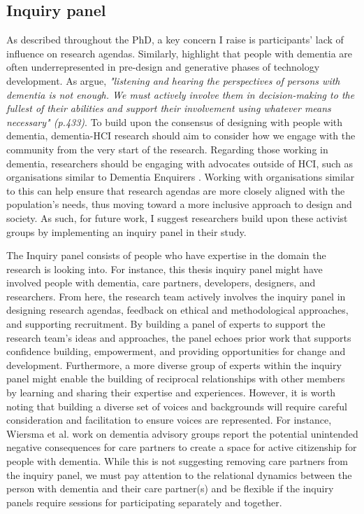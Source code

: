 \subsection{Inquiry panel}
\label{Inquiry Panel}
As described throughout the PhD, a key concern I raise is participants' lack of influence on research agendas. Similarly, \cite{suijkerbuijk_active_2019} highlight that people with dementia are often underrepresented in pre-design and generative phases of technology development. As \cite{dupuis_moving_2012} argue, \textit{"listening and hearing the perspectives of persons with dementia is not enough. We must actively involve them in decision-making to the fullest of their abilities and support their involvement using whatever means necessary" (p.433)}. To build upon the consensus of designing with people with dementia, dementia-HCI research should aim to consider how we engage with the community from the very start of the research. Regarding those working in dementia, researchers should be engaging with advocates outside of HCI, such as organisations similar to Dementia Enquirers \citep{davies2021dementia}. Working with organisations similar to this can help ensure that research agendas are more closely aligned with the population's needs, thus moving toward a more inclusive approach to design and society. As such, for future work, I suggest researchers build upon these activist groups by implementing an inquiry panel in their study.

The Inquiry panel consists of people who have expertise in the domain the research is looking into. For instance, this thesis inquiry panel might have involved people with dementia, care partners, developers, designers, and researchers. From here, the research team actively involves the inquiry panel in designing research agendas, feedback on ethical and methodological approaches, and supporting recruitment. By building a panel of experts to support the research team’s ideas and approaches, the panel echoes prior work that supports confidence building, empowerment, and providing opportunities for change and development. Furthermore, a more diverse group of experts within the inquiry panel might enable the building of reciprocal relationships with other members by learning and sharing their expertise and experiences. However, it is worth noting that building a diverse set of voices and backgrounds will require careful consideration and facilitation to ensure voices are represented. For instance, Wiersma et al. work on dementia advisory groups report the potential unintended negative consequences for care partners to create a space for active citizenship for people with dementia. While this is not suggesting removing care partners from the inquiry panel, we must pay attention to the relational dynamics between the person with dementia and their care partner(s) and be flexible if the inquiry panels require sessions for participating separately and together.  


